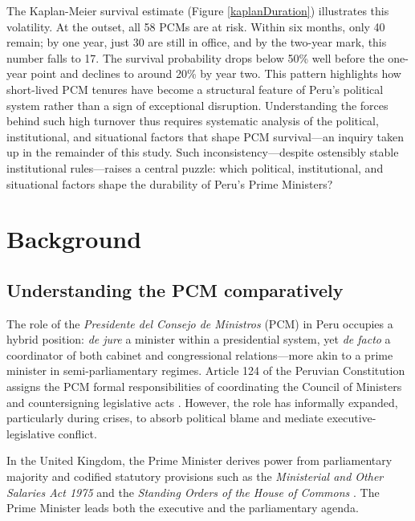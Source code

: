 \documentclass[a4paper, 12pt]{article}
\begin{document}
The Kaplan-Meier survival estimate (Figure \ref{kaplanDuration}) illustrates this volatility. At the outset, all 58 PCMs are at risk. Within six months, only 40 remain; by one year, just 30 are still in office, and by the two-year mark, this number falls to 17. The survival probability drops below 50\% well before the one-year point and declines to around 20\% by year two. This pattern highlights how short-lived PCM tenures have become a structural feature of Peru’s political system rather than a sign of exceptional disruption. Understanding the forces behind such high turnover thus requires systematic analysis of the political, institutional, and situational factors that shape PCM survival—an inquiry taken up in the remainder of this study. Such inconsistency—despite ostensibly stable institutional rules—raises a central puzzle: which political, institutional, and situational factors shape the durability of Peru’s Prime Ministers?



\section{Background}\label{backg-tables} %


\subsection{Understanding the PCM comparatively}

The role of the \textit{Presidente del Consejo de Ministros} (PCM) in Peru occupies a hybrid position: \textit{de jure} a minister within a presidential system, yet \textit{de facto} a coordinator of both cabinet and congressional relations—more akin to a prime minister in semi-parliamentary regimes. Article 124 of the Peruvian Constitution assigns the PCM formal responsibilities of coordinating the Council of Ministers and countersigning legislative acts \citep{republica_del_peru_constitucion_1993}. However, the role has informally expanded, particularly during crises, to absorb political blame and mediate executive-legislative conflict.

In the United Kingdom, the Prime Minister derives power from parliamentary majority and codified statutory provisions such as the \textit{Ministerial and Other Salaries Act 1975} \citep{united_kingdom_parliament_ministerial_1975} and the \textit{Standing Orders of the House of Commons} \citep{house_of_commons_standing_2024}. The Prime Minister leads both the executive and the parliamentary agenda.
\end{document}
